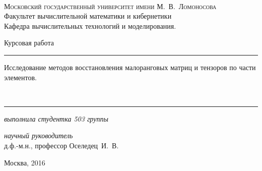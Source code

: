 \begin{titlepage}

 \begin{center}
 \ \vspace{-3cm}

{\scshape Московский государственный университет имени М.~В.~Ломоносова}\\
Факультет вычислительной математики и кибернетики\\
Кафедра вычислительных технологий и моделирования.

 \vfill

 {\LARGE\sffamily Курсовая работа }\vspace{0.5cm}

 \hrule\vspace{0.2cm}
 {\Huge\bfseries\sffamily \strut Исследование методов восстановления малоранговых матриц и тензоров по части элементов.\strut}
 \\[0.2cm]
 \hrule
 \end{center}

\vspace{1cm}
\begin{center}
  \large
  \textit{выполнила студентка 503 группы}\\

  \vspace{5mm}

  \textit{научный руководитель}\\
  {\large д.ф.-м.н., профессор Оселедец~И.~В.}
\end{center}

\vfill

\begin{center}
{\large Москва, 2016}
\end{center}
\end{titlepage}

\newpage 